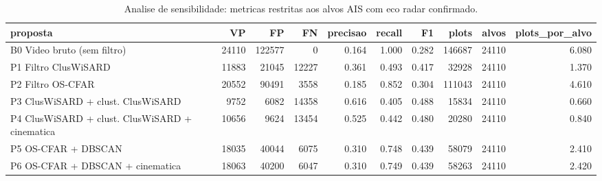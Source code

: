 \begin{table}[!ht]
\centering
\small
\caption{Analise de sensibilidade: metricas restritas aos alvos AIS com eco radar confirmado.}
\label{tab:comparacao_conf}
\begin{tabular}{lrrrrrrrrr}
\hline
proposta & VP & FP & FN & precisao & recall & F1 & plots & alvos & plots\_por\_alvo \\
\hline
B0  Video bruto (sem filtro) & 24110 & 122577 & 0 & 0.164 & 1.000 & 0.282 & 146687 & 24110 & 6.080 \\
P1  Filtro ClusWiSARD & 11883 & 21045 & 12227 & 0.361 & 0.493 & 0.417 & 32928 & 24110 & 1.370 \\
P2  Filtro OS-CFAR & 20552 & 90491 & 3558 & 0.185 & 0.852 & 0.304 & 111043 & 24110 & 4.610 \\
P3  ClusWiSARD + clust. ClusWiSARD & 9752 & 6082 & 14358 & 0.616 & 0.405 & 0.488 & 15834 & 24110 & 0.660 \\
P4  ClusWiSARD + clust. ClusWiSARD + cinematica & 10656 & 9624 & 13454 & 0.525 & 0.442 & 0.480 & 20280 & 24110 & 0.840 \\
P5  OS-CFAR + DBSCAN & 18035 & 40044 & 6075 & 0.310 & 0.748 & 0.439 & 58079 & 24110 & 2.410 \\
P6  OS-CFAR + DBSCAN + cinematica & 18063 & 40200 & 6047 & 0.310 & 0.749 & 0.439 & 58263 & 24110 & 2.420 \\
\hline
\end{tabular}
\end{table}
